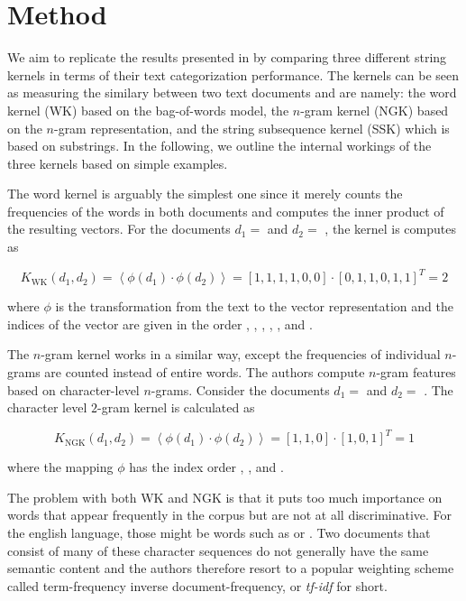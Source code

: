 \section{Method} \label{sec:method}

We aim to replicate the results presented in \cite{ssk} by comparing three different string kernels in terms of their text categorization performance. The kernels can be seen as measuring the similary between two text documents and are namely: the word kernel (WK) based on the bag-of-words model, the $n$-gram kernel (NGK) based on the $n$-gram representation, and the string subsequence kernel (SSK) which is based on substrings. In the following, we outline the internal workings of the three kernels based on simple examples.

The word kernel is arguably the simplest one since it merely counts the frequencies of the words in both documents and computes the inner product of the resulting vectors. For the documents $d_1 = $  and $d_2 = $ , the kernel is computes as

\begin{equation} \label{eq:wk}
  K_\text{WK}(d_1, d_2) = \left\langle \phi(d_1) \cdot \phi(d_2) \right\rangle = [1, 1, 1, 1, 0, 0] \cdot [0, 1, 1, 0, 1, 1]^T = 2
\end{equation}

where $\phi$ is the transformation from the text to the vector representation and the indices of the vector are given in the order , , , , , and .

The $n$-gram kernel works in a similar way, except the frequencies of individual $n$-grams are counted instead of entire words. The authors compute $n$-gram features based on character-level $n$-grams. Consider the documents $d_1 = $  and $d_2 = $ . The character level $2$-gram kernel is calculated as

\begin{equation} \label{eq:ngk}
 K_\text{NGK}(d_1, d_2) = \left\langle \phi(d_1) \cdot \phi(d_2) \right\rangle = [1, 1, 0] \cdot [1, 0, 1]^T = 1
\end{equation}

where the mapping $\phi$ has the index order , , and .

The problem with both WK and NGK is that it puts too much importance on words that appear frequently in the corpus but are not at all discriminative. For the english language, those might be words such as  or . Two documents that consist of many of these character sequences do not generally have the same semantic content and the authors therefore resort to a popular weighting scheme called term-frequency inverse document-frequency, or \textit{tf-idf} for short.

